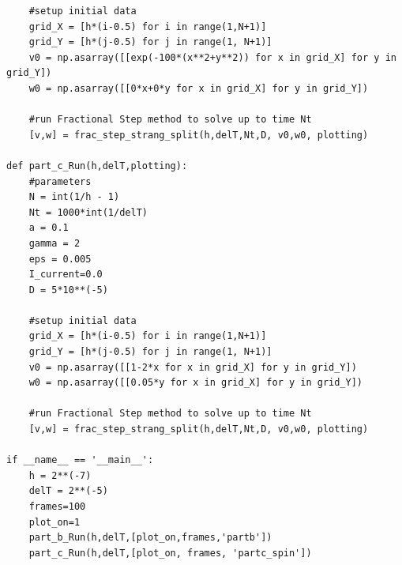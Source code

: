 \documentclass[12pt]{article}
\begin{document}
\begin{verbatim}
    #setup initial data
    grid_X = [h*(i-0.5) for i in range(1,N+1)]
    grid_Y = [h*(j-0.5) for j in range(1, N+1)]
    v0 = np.asarray([[exp(-100*(x**2+y**2)) for x in grid_X] for y in grid_Y])
    w0 = np.asarray([[0*x+0*y for x in grid_X] for y in grid_Y])
    
    #run Fractional Step method to solve up to time Nt
    [v,w] = frac_step_strang_split(h,delT,Nt,D, v0,w0, plotting)

def part_c_Run(h,delT,plotting):
    #parameters
    N = int(1/h - 1)
    Nt = 1000*int(1/delT)
    a = 0.1
    gamma = 2
    eps = 0.005
    I_current=0.0
    D = 5*10**(-5)

    #setup initial data
    grid_X = [h*(i-0.5) for i in range(1,N+1)]
    grid_Y = [h*(j-0.5) for j in range(1, N+1)]
    v0 = np.asarray([[1-2*x for x in grid_X] for y in grid_Y])
    w0 = np.asarray([[0.05*y for x in grid_X] for y in grid_Y])
    
    #run Fractional Step method to solve up to time Nt
    [v,w] = frac_step_strang_split(h,delT,Nt,D, v0,w0, plotting)

if __name__ == '__main__':
    h = 2**(-7)
    delT = 2**(-5)
    frames=100
    plot_on=1
    part_b_Run(h,delT,[plot_on,frames,'partb'])
    part_c_Run(h,delT,[plot_on, frames, 'partc_spin'])  
\end{verbatim}
\end{document}
